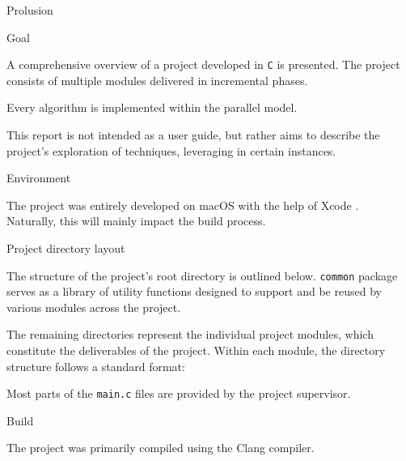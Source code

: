 \begin{chapter}{Prolusion}
	\begin{section}{Goal}
		\par A comprehensive overview of a  project developed in \texttt{C} is presented. The project consists of multiple modules delivered in incremental phases.
		\par Every algorithm is implemented within the \textbf{} parallel model. \\
		\par This report is not intended as a user guide, but rather aims to describe the project’s exploration of  techniques, leveraging  in certain instances.
	\end{section}
	\begin{section}{Environment}
		\par The project was entirely developed on macOS with the help of Xcode .\\
		Naturally, this will mainly impact the build process.
	\end{section}
	\clearpage
	\begin{section}{Project directory layout}
		\par The structure of the project’s root directory is outlined below.
		\medskip
		\medskip
		\texttt{common} package serves as a library of utility functions designed to support and be reused by various modules across the project.
		\vspace{\baselineskip}
		\par The remaining directories represent the individual project modules, which constitute the deliverables of the project. Within each module, the directory structure follows a standard format:
		\medskip
		\medskip
		\par Most parts of the \texttt{main.c} files are provided by the project supervisor.
	\end{section}
	\clearpage
	\begin{section}{Build}
		\par The project was primarily compiled using the Clang compiler.\\

\end{section}
\end{chapter}

